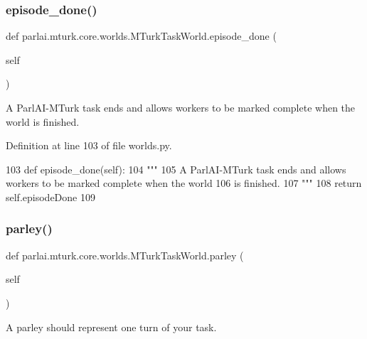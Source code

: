 \subsubsection{\texorpdfstring{episode\+\_\+done()}{episode\_done()}}
{\footnotesize\ttfamily def parlai.\+mturk.\+core.\+worlds.\+M\+Turk\+Task\+World.\+episode\+\_\+done (\begin{DoxyParamCaption}\item[{}]{self }\end{DoxyParamCaption})}

\begin{DoxyVerb}A ParlAI-MTurk task ends and allows workers to be marked complete when the world
is finished.
\end{DoxyVerb}
 

Definition at line 103 of file worlds.\+py.


\begin{DoxyCode}
103     \textcolor{keyword}{def }episode\_done(self):
104         \textcolor{stringliteral}{"""}
105 \textcolor{stringliteral}{        A ParlAI-MTurk task ends and allows workers to be marked complete when the world}
106 \textcolor{stringliteral}{        is finished.}
107 \textcolor{stringliteral}{        """}
108         \textcolor{keywordflow}{return} self.episodeDone
109 
\end{DoxyCode}
\mbox{\label{classparlai_1_1mturk_1_1core_1_1worlds_1_1MTurkTaskWorld_aafb537fad9c12b4371599b0559d37c42}} 
\subsubsection{\texorpdfstring{parley()}{parley()}}
{\footnotesize\ttfamily def parlai.\+mturk.\+core.\+worlds.\+M\+Turk\+Task\+World.\+parley (\begin{DoxyParamCaption}\item[{}]{self }\end{DoxyParamCaption})}

\begin{DoxyVerb}A parley should represent one turn of your task.
\end{DoxyVerb}
 

